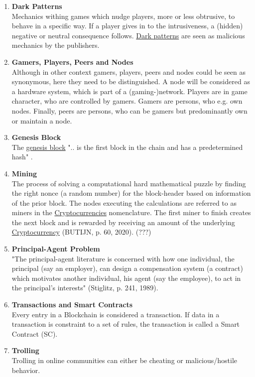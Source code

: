 \begin{enumerate}
	\item \textbf{Dark Patterns} \label{def_DarkPatterns} \\
	Mechanics withing games which nudge players, more or less obtrusive, to behave in a specific way.
	If a player gives in to the intrusiveness, a (hidden) negative or neutral consequence follows.
	\hyperref[def_DarkPatterns]{Dark patterns} are seen as malicious mechanics by the publishers.
	
	\item \textbf{Gamers, Players, Peers and Nodes} \label{def_GamersPlayersPeersAndNodes} \\
	Although in other context gamers, players, peers and nodes could be seen as synonymous, here they need to be distinguished.
	A node will be considered as a hardware system, which is part of a (gaming-)network.
	Players are in game character, who are controlled by gamers.
	Gamers are persons, who e.g. own nodes.
	Finally, peers are persons, who can be gamers but predominantly own or maintain a node.
	
	\item \textbf{Genesis Block} \label{def_GenesisBlock} \\
	The \hyperref[def_GenesisBlock]{genesis block} ".. is the first block in the chain and has a predetermined hash" \cite[181]{Oliveira.19.02.201921.02.2019}.
	
	\item \textbf{Mining} \label{def_Mining} \\
	The process of solving a computational hard mathematical puzzle by finding the right nonce (a random number) for the block-header based on information of the prior block.
	The nodes executing the calculations are referred to as miners in the \hyperref[def_Cryptocurrency]{Cryptocurrencies} nomenclature.
	The first miner to finish creates the next block and is rewarded by receiving an amount of the underlying \hyperref[def_Cryptocurrency]{Cryptocurrency} (BUTIJN, p. 60, 2020). (???)
	
	\item \textbf{Principal-Agent Problem} \label{def_PrincipalAgentProblem} \\
	"The principal-agent literature is concerned with how one individual, the principal (say an employer), can design a compensation system (a contract) which motivates another individual, his agent (say the employee), to act in the principal's interests" (Stiglitz, p. 241, 1989).
	
	\item \textbf{Transactions and Smart Contracts} \label{def_TransactionsAndSC} \\
	Every entry in a Blockchain is considered a transaction.	
	If data in a transaction is constraint to a set of rules, the transaction is called a Smart Contract (SC).
	
	\item \textbf{Trolling} \label{def_Trolling} \\
	Trolling in online communities can either be cheating or malicious/hostile behavior. 
	
\end{enumerate}